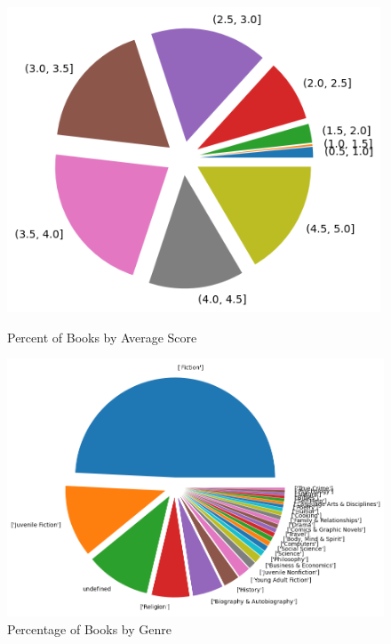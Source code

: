 \documentclass[12pt]{article}
\numberwithin{equation}{section}
\begin{document}
\begin{figure}
    \begin{minipage}[b]{0.5\linewidth}
    \centering
    \includegraphics[width=0.99\textwidth]{percent_book_reviews.png}
    \caption{Percent of Books by Average Score}
\end{minipage}
    \hspace{0.01cm}
\begin{minipage}[b]{0.45\linewidth}
    \centering
    \includegraphics[width=1.2\textwidth]{genre_counts.png}
    \caption{Percentage of Books by Genre}
    \end{minipage}

\end{figure}
\end{document}
